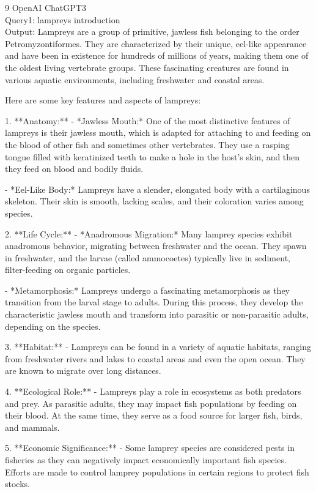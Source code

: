 \documentclass[CTeX = true]{mcmthesis}  %
\begin{document}
\begin{ReportAiUse}{9}
OpenAI ChatGPT3\\
Query1: lampreys introduction\\
Output: Lampreys are a group of primitive, jawless fish belonging to the order Petromyzontiformes. They are characterized by their unique, eel-like appearance and have been in existence for hundreds of millions of years, making them one of the oldest living vertebrate groups. These fascinating creatures are found in various aquatic environments, including freshwater and coastal areas.

Here are some key features and aspects of lampreys:

1. **Anatomy:**
   - *Jawless Mouth:* One of the most distinctive features of lampreys is their jawless mouth, which is adapted for attaching to and feeding on the blood of other fish and sometimes other vertebrates. They use a rasping tongue filled with keratinized teeth to make a hole in the host's skin, and then they feed on blood and bodily fluids.

   - *Eel-Like Body:* Lampreys have a slender, elongated body with a cartilaginous skeleton. Their skin is smooth, lacking scales, and their coloration varies among species.

2. **Life Cycle:**
   - *Anadromous Migration:* Many lamprey species exhibit anadromous behavior, migrating between freshwater and the ocean. They spawn in freshwater, and the larvae (called ammocoetes) typically live in sediment, filter-feeding on organic particles.

   - *Metamorphosis:* Lampreys undergo a fascinating metamorphosis as they transition from the larval stage to adults. During this process, they develop the characteristic jawless mouth and transform into parasitic or non-parasitic adults, depending on the species.

3. **Habitat:**
   - Lampreys can be found in a variety of aquatic habitats, ranging from freshwater rivers and lakes to coastal areas and even the open ocean. They are known to migrate over long distances.

4. **Ecological Role:**
   - Lampreys play a role in ecosystems as both predators and prey. As parasitic adults, they may impact fish populations by feeding on their blood. At the same time, they serve as a food source for larger fish, birds, and mammals.

5. **Economic Significance:**
   - Some lamprey species are considered pests in fisheries as they can negatively impact economically important fish species. Efforts are made to control lamprey populations in certain regions to protect fish stocks.


\end{ReportAiUse}
\end{document}
